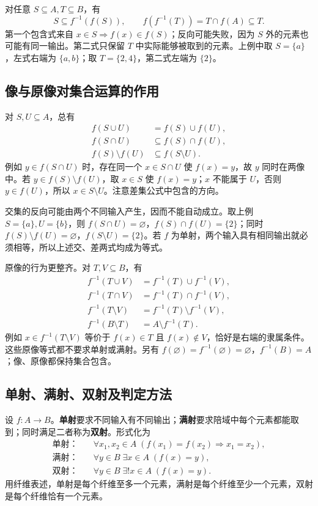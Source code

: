 \documentclass[UTF8,fontset=none,zihao=-4,a4paper]{ctexart}
\newcommand{\term}[1]{\textbf{#1}}
\begin{document}
对任意 $S\subseteq A,T\subseteq B$，有
\[
S\subseteq f^{-1}(f(S)),\qquad f(f^{-1}(T))=T\cap f(A)\subseteq T.
\]
第一个包含式来自 $x\in S\Rightarrow f(x)\in f(S)$；反向可能失败，因为 $S$ 外的元素也可能有同一输出。第二式只保留 $T$ 中实际能够被取到的元素。上例中取 $S=\{a\}$，左式右端为 $\{a,b\}$；取 $T=\{2,4\}$，第二式左端为 $\{2\}$。

\subsection{像与原像对集合运算的作用}
对 $S,U\subseteq A$，总有
\begin{align*}
f(S\cup U)&=f(S)\cup f(U),\\
f(S\cap U)&\subseteq f(S)\cap f(U),\\
f(S)\setminus f(U)&\subseteq f(S\setminus U).
\end{align*}
例如 $y\in f(S\cap U)$ 时，存在同一个 $x\in S\cap U$ 使 $f(x)=y$，故 $y$ 同时在两像中。若 $y\in f(S)\setminus f(U)$，取 $x\in S$ 使 $f(x)=y$；$x$ 不能属于 $U$，否则 $y\in f(U)$，所以 $x\in S\setminus U$。注意差集公式中包含的方向。

交集的反向可能由两个不同输入产生，因而不能自动成立。取上例 $S=\{a\},U=\{b\}$，则 $f(S\cap U)=\varnothing$，$f(S)\cap f(U)=\{2\}$；同时 $f(S)\setminus f(U)=\varnothing$，$f(S\setminus U)=\{2\}$。若 $f$ 为单射，两个输入具有相同输出就必须相等，所以上述交、差两式均成为等式。

原像的行为更整齐。对 $T,V\subseteq B$，有
\begin{align*}
f^{-1}(T\cup V)&=f^{-1}(T)\cup f^{-1}(V),\\
f^{-1}(T\cap V)&=f^{-1}(T)\cap f^{-1}(V),\\
f^{-1}(T\setminus V)&=f^{-1}(T)\setminus f^{-1}(V),\\
f^{-1}(B\setminus T)&=A\setminus f^{-1}(T).
\end{align*}
例如 $x\in f^{-1}(T\setminus V)$ 等价于 $f(x)\in T$ 且 $f(x)\notin V$，恰好是右端的隶属条件。这些原像等式都不要求单射或满射。另有 $f(\varnothing)=f^{-1}(\varnothing)=\varnothing$，$f^{-1}(B)=A$；像、原像都保持集合包含。

\subsection{单射、满射、双射及判定方法}
设 $f:A\to B$。\term{单射}要求不同输入有不同输出；\term{满射}要求陪域中每个元素都能取到；同时满足二者称为\term{双射}。形式化为
\begin{align*}
\text{单射：}&\quad\forall x_1,x_2\in A\;(f(x_1)=f(x_2)\Rightarrow x_1=x_2),\\
\text{满射：}&\quad\forall y\in B\;\exists x\in A\;(f(x)=y),\\
\text{双射：}&\quad\forall y\in B\;\exists!x\in A\;(f(x)=y).
\end{align*}
用纤维表述，单射是每个纤维至多一个元素，满射是每个纤维至少一个元素，双射是每个纤维恰有一个元素。
\end{document}
